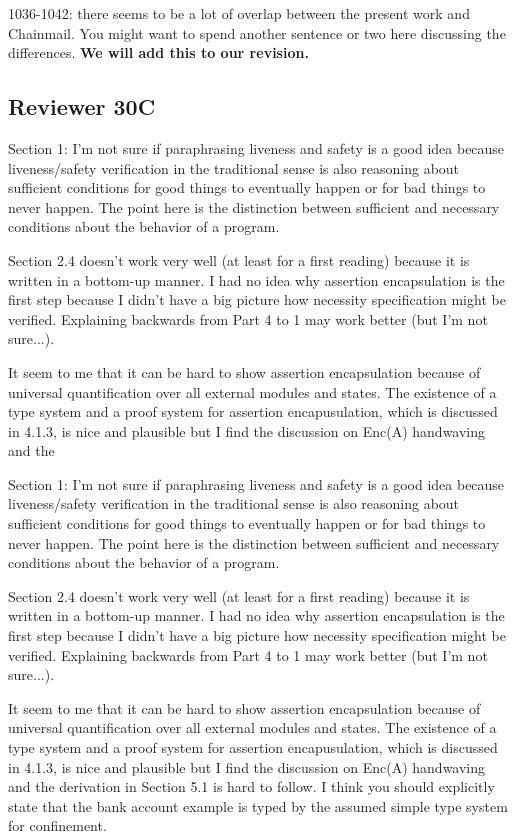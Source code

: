 \documentclass[11pt]{amsart}
\newcommand{\us}[1]{\bf #1}
\begin{document}
1036-1042: there seems to be a lot of overlap between the present work and Chainmail. You might want to spend another sentence or two here discussing the differences.
{\us{We will add this to our revision.}}
  
 
  \subsection*{Reviewer 30C}
  

Section 1: I'm not sure if paraphrasing liveness and safety is a good
idea because liveness/safety verification in the traditional sense is
also reasoning about sufficient conditions for good things to
eventually happen or for bad things to never happen.  The point
here is the distinction between sufficient and necessary conditions
about the behavior of a program.

Section 2.4 doesn't work very well (at least for a first reading)
because it is written in a bottom-up manner.  I had no idea why
assertion encapsulation is the first step because I didn't have a big
picture how necessity specification might be verified.  Explaining backwards from Part 4 to 1
may work better (but I'm not sure...).

It seem to me that it can be hard to show assertion encapsulation
because of universal quantification over all external modules and
states.  The existence of a type system and a proof system for
assertion encapusulation, which is discussed in 4.1.3, is nice and
plausible but I find the discussion on Enc(A) handwaving and the
  


Section 1: I'm not sure if paraphrasing liveness and safety is a good
idea because liveness/safety verification in the traditional sense is
also reasoning about sufficient conditions for good things to
eventually happen or for bad things to never happen.  The point
here is the distinction between sufficient and necessary conditions
about the behavior of a program.

Section 2.4 doesn't work very well (at least for a first reading)
because it is written in a bottom-up manner.  I had no idea why
assertion encapsulation is the first step because I didn't have a big
picture how necessity specification might be verified.  Explaining backwards from Part 4 to 1
may work better (but I'm not sure...).

It seem to me that it can be hard to show assertion encapsulation
because of universal quantification over all external modules and
states.  The existence of a type system and a proof system for
assertion encapusulation, which is discussed in 4.1.3, is nice and
plausible but I find the discussion on Enc(A) handwaving and the
derivation in Section 5.1 is hard to follow.  I think you should
explicitly state that the bank account example is typed by the assumed
simple type system for confinement.
\end{document}
